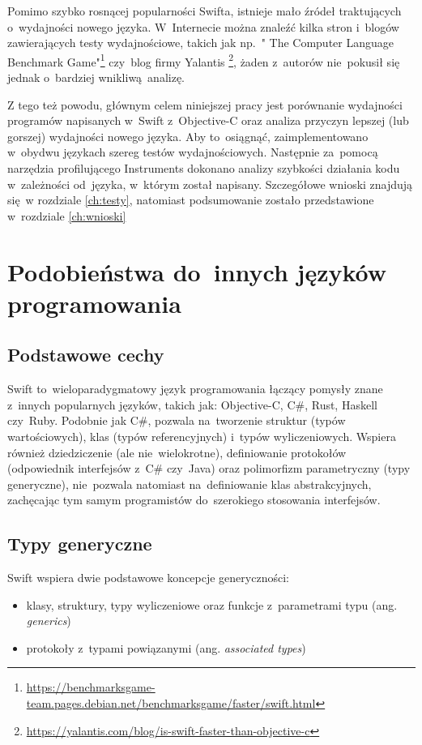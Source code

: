 \documentclass[mgr, shortabstract]{iithesis}
\begin{document}
Pomimo szybko rosnącej popularności Swifta, istnieje mało źródeł traktujących o~wydajności nowego języka. W~Internecie można znaleźć kilka stron i~blogów zawierających testy wydajnościowe, takich jak np.~" The Computer Language Benchmark Game"\footnote{\url{https://benchmarksgame-team.pages.debian.net/benchmarksgame/faster/swift.html}} czy~blog firmy Yalantis \footnote{\url{https://yalantis.com/blog/is-swift-faster-than-objective-c}}, żaden z~autorów nie~pokusił się jednak o~bardziej wnikliwą analizę. 

Z tego też powodu, głównym celem niniejszej pracy jest porównanie wydajności programów napisanych w~Swift z~Objective-C oraz analiza przyczyn lepszej (lub gorszej) wydajności nowego języka. Aby to~osiągnąć, zaimplementowano w~obydwu językach szereg testów wydajnościowych. Następnie za~pomocą narzędzia profilującego Instruments dokonano analizy szybkości działania kodu w~zależności od~języka, w~którym został napisany. Szczegółowe wnioski znajdują się w rozdziale \ref{ch:testy}, natomiast podsumowanie zostało przedstawione w~rozdziale \ref{ch:wnioski}

\chapter{Podobieństwa do~innych języków programowania}
\label{ch:podobienstwa_do_innych}

\section{Podstawowe cechy}
\label{s:podstawowe_cechy}

Swift to~wieloparadygmatowy język programowania łączący pomysły znane z~innych popularnych języków, takich jak: Objective-C, C\#, Rust, Haskell czy~Ruby. Podobnie jak C\#, pozwala na~tworzenie struktur (typów wartościowych), klas (typów referencyjnych) i~typów wyliczeniowych. Wspiera również dziedziczenie (ale nie~wielokrotne), definiowanie protokołów (odpowiednik interfejsów z~C\# czy~Java) oraz polimorfizm parametryczny (typy generyczne), nie~pozwala natomiast na~definiowanie klas abstrakcyjnych, zachęcając tym samym programistów do~szerokiego stosowania interfejsów.

\section{Typy generyczne}
\label{s:typy_generyczne}

Swift wspiera dwie podstawowe koncepcje generyczności:
\begin{itemize}
  \item klasy, struktury, typy wyliczeniowe oraz funkcje z~parametrami typu (ang. \textit{generics})
  \item protokoły z~typami powiązanymi (ang. \textit{associated types})
\end{itemize}
\end{document}
